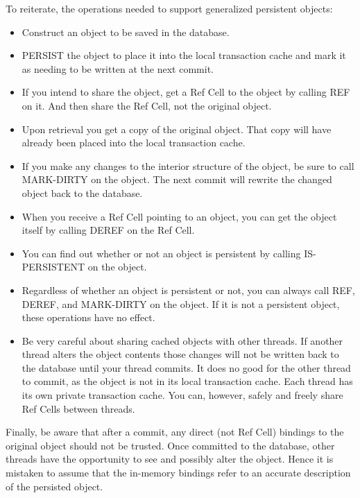 \documentclass[article,oneside]{memoir}
\begin{document}
To reiterate, the operations needed to support generalized persistent objects:
\begin{itemize}
\item Construct an object to be saved in the database.

\item {\ttfamily PERSIST} the object to place it into the local transaction cache and mark it as needing to be written at the next commit.

\item If you intend to share the object, get a Ref Cell to the object by calling {\ttfamily REF} on it. And then share the Ref Cell, not the original object.

\item Upon retrieval you get a copy of the original object. That copy will have  already been placed into the local transaction cache.

\item If you make any changes to the interior structure of the object, be sure to call {\ttfamily MARK-DIRTY} on the object. The next commit will rewrite the changed object back to the database.

\item When you receive a Ref Cell pointing to an object, you can get the object itself by calling {\ttfamily DEREF} on the Ref Cell.

\item You can find out whether or not an object is persistent by calling {\ttfamily IS-PERSISTENT} on the object.

\item Regardless of whether an object is persistent or not, you can always call {\ttfamily REF}, {\ttfamily DEREF}, and {\ttfamily MARK-DIRTY} on the object. If it is not a persistent object, these operations have no effect.

\item Be very careful about sharing cached objects with other threads. If another thread alters the object contents those changes will not be written back to the database until your thread commits. It does no good for the other thread to commit, as the object is not in its local transaction cache. Each thread has its own private transaction cache. You can, however, safely and freely share Ref Cells between threads.
\end{itemize}

Finally, be aware that after a commit, any direct (not Ref Cell) bindings to the original object should not be trusted. Once committed to the database, other threads have the opportunity to see and possibly alter the object. Hence it is mistaken to assume that the in-memory bindings refer to an accurate description of the persisted object.
\end{document}

